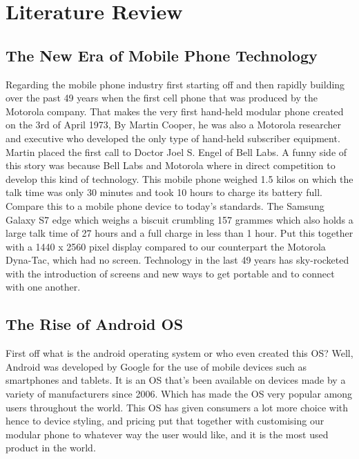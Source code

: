 \chapter{Literature Review}

\section{The New Era of Mobile Phone Technology}
Regarding the mobile phone industry first starting off and then rapidly building over the past 49 years when the first cell phone that was produced by the Motorola company. That makes the very first hand-held modular phone created on the 3rd of April 1973, By Martin Cooper, he was also a Motorola researcher and executive who developed the only type of hand-held subscriber equipment. Martin placed the first call to Doctor Joel S. Engel of Bell Labs.
\newline
\newline
A funny side of this story was because Bell Labs and Motorola where in direct competition to develop this kind of technology. This mobile phone weighed 1.5 kilos on which the talk time was only 30 minutes and took 10 hours to charge its battery full. \cite{cellHist}
\newline
\newline
Compare this to a mobile phone device to today's standards. The Samsung Galaxy S7 edge which weighs a biscuit crumbling 157 grammes which also holds a large talk time of 27 hours and a full charge in less than 1 hour. Put this together with a 1440 x 2560 pixel display compared to our counterpart the Motorola Dyna-Tac, which had no screen. Technology in the last 49 years has sky-rocketed with the introduction of screens and new ways to get portable and to connect with one another.  \cite{GSMsam}
  
\section{The Rise of Android OS}
First off what is the android operating system or who even created this OS? Well, Android was developed by Google for the use of mobile devices such as smartphones and tablets. It is an OS that's been available on devices made by a variety of manufacturers since 2006. Which has made the OS very popular among users throughout the world. This OS has given consumers a lot more choice with hence to device styling, and pricing put that together with customising our modular phone to whatever way the user would like, and it is the most used product in the world. \cite{androidOS} \par

